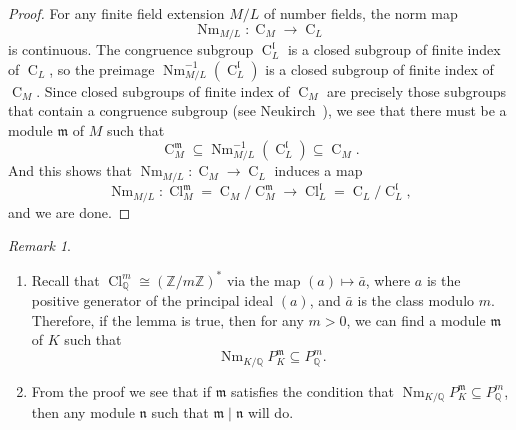 \documentclass{amsart}
\numberwithin{equation}{section}
\theoremstyle{plain}
\theoremstyle{definition}
\theoremstyle{remark}
\newtheorem*{remark}{Remark}
\begin{document}
\begin{proof}
	For any finite field extension $M/L$ of number fields, the norm map
	\begin{equation*}
		\operatorname{Nm}_{M/L}:\operatorname{C}_M\to\operatorname{C}_L
	\end{equation*}
	is continuous.
	The congruence subgroup $\operatorname{C}_{L}^{\mathfrak{l}}$ is a closed subgroup of finite index of $\operatorname{C}_{L}$, so the preimage $\operatorname{Nm}_{M/L}^{-1}(\operatorname{C}_{L}^{\mathfrak{l}})$ is a closed subgroup of finite index of $\operatorname{C}_M$.
	Since closed subgroups of finite index of $\operatorname{C}_M$ are precisely those subgroups that contain a congruence subgroup (see Neukirch~\cite[VI.1.8]{neukirch2013algebraic}), we see that there must be a module $\mathfrak{m}$ of $M$ such that
	\begin{equation*}
		\operatorname{C}_M^{\mathfrak{m}}\subseteq\operatorname{Nm}_{M/L}^{-1}(\operatorname{C}_{L}^{\mathfrak{l}})\subseteq\operatorname{C}_M.
	\end{equation*}
	And this shows that $\operatorname{Nm}_{M/L}:\operatorname{C}_M\to\operatorname{C}_{L}$ induces a map
	\begin{equation*}
		\operatorname{Nm}_{M/L}:\operatorname{Cl}_M^{\mathfrak{m}}=\operatorname{C}_M/\operatorname{C}_M^{\mathfrak{m}}\to\operatorname{Cl}_{L}^{\mathfrak{l}}=\operatorname{C}_{L}/\operatorname{C}_{L}^{\mathfrak{l}},
	\end{equation*}
	and we are done.
\end{proof}
\begin{remark}
	\begin{enumerate}
		\item Recall that $\operatorname{Cl}_{\mathbb{Q}}^m\cong(\mathbb{Z}/m\mathbb{Z})^*$ via the map $(a)\mapsto \bar{a}$, where $a$ is the positive generator of the principal ideal $(a)$, and $\bar{a}$ is the class modulo $m$.
		Therefore, if the lemma is true, then for any $m>0$, we can find a module $\mathfrak{m}$ of $K$ such that
		\begin{equation*}
			\operatorname{Nm}_{K/\mathbb{Q}}P_{K}^{\mathfrak{m}}\subseteq P_{\mathbb{Q}}^m.
		\end{equation*}
		\item From the proof we see that if $\mathfrak{m}$ satisfies the condition that $\operatorname{Nm}_{K/\mathbb{Q}}P_{K}^{\mathfrak{m}}\subseteq P_{\mathbb{Q}}^m$, then any module $\mathfrak{n}$ such that $\mathfrak{m}\mid\mathfrak{n}$ will do.
	\end{enumerate}	
\end{remark}
\end{document}
